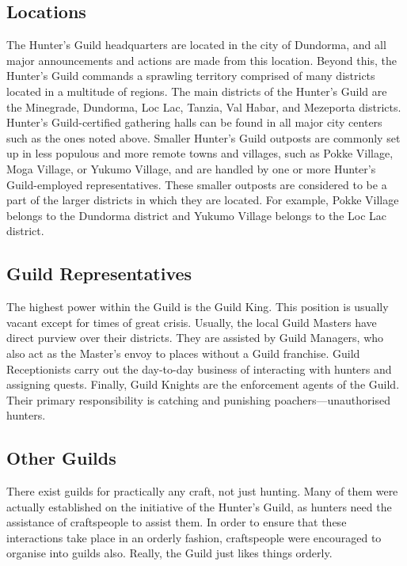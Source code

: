 \subsection{Locations}
The Hunter's Guild headquarters are located in the city of Dundorma, and all major announcements and actions are made from this location. Beyond this, the Hunter's Guild commands a sprawling territory comprised of many districts located in a multitude of regions. The main districts of the Hunter's Guild are the Minegrade, Dundorma, Loc Lac, Tanzia, Val Habar, and Mezeporta districts. Hunter's Guild-certified gathering halls can be found in all major city centers such as the ones noted above. Smaller Hunter's Guild outposts are commonly set up in less populous and more remote towns and villages, such as Pokke Village, Moga Village, or Yukumo Village, and are handled by one or more Hunter's Guild-employed representatives. These smaller outposts are considered to be a part of the larger districts in which they are located. For example, Pokke Village belongs to the Dundorma district and Yukumo Village belongs to the Loc Lac district.

\subsection{Guild Representatives}
The highest power within the Guild is the Guild King. This position is usually vacant except for times of great crisis. Usually, the local Guild Masters have direct purview over their districts. They are assisted by Guild Managers, who also act as the Master's envoy to places without a Guild franchise. Guild Receptionists carry out the day-to-day business of interacting with hunters and assigning quests. Finally, Guild Knights are the enforcement agents of the Guild. Their primary responsibility is catching and punishing poachers---unauthorised hunters.

\subsection{Other Guilds}
There exist guilds for practically any craft, not just hunting. Many of them were actually established on the initiative of the Hunter's Guild, as hunters need the assistance of craftspeople to assist them. In order to ensure that these interactions take place in an orderly fashion, craftspeople were encouraged to organise into guilds also. Really, the Guild just likes things orderly.

\newpage
\hbWideBottomArtFirstPageFix

